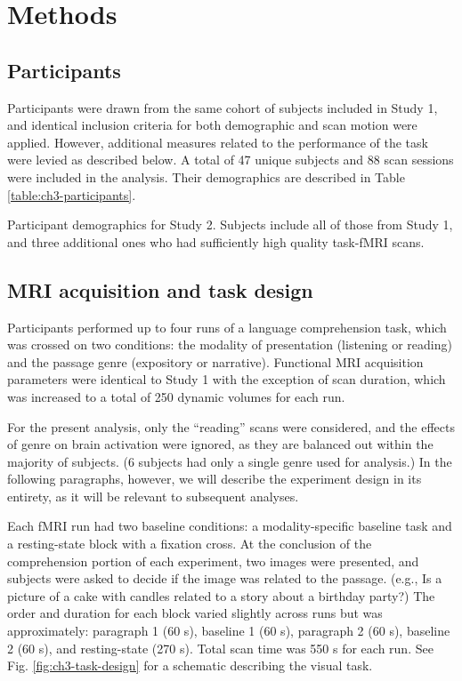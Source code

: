 \section{Methods}

\subsection{Participants}

Participants were drawn from the same cohort of subjects included in Study 1, and identical inclusion criteria for both demographic and scan motion were applied. However, additional measures related to the performance of the task were levied as described below. A total of 47 unique subjects and 88 scan sessions were included in the analysis. Their demographics are described in Table \ref{table:ch3-participants}.

\begin{table}
	\renewcommand{\tabcolsep}{0.09cm}
	\centering
	
	\caption[Participant demographics for Study 2.]{Participant demographics for Study 2. Subjects include all of those from Study 1, and three additional ones who had sufficiently high quality task-fMRI scans.}
	\label{table:ch3-participants}
\end{table}


\subsection{MRI acquisition and task design}

Participants performed up to four runs of a language comprehension task, which was crossed on two conditions: the modality of presentation (listening or reading) and the passage genre (expository or narrative). Functional MRI acquisition parameters were identical to Study 1 with the exception of scan duration, which was increased to a total of 250 dynamic volumes for each run. 

For the present analysis, only the ``reading'' scans were considered, and the effects of genre on brain activation were ignored, as they are balanced out within the majority of subjects. (6 subjects had only a single genre used for analysis.) In the following paragraphs, however, we will describe the experiment design in its entirety, as it will be relevant to subsequent analyses.

Each fMRI run had two baseline conditions: a modality-specific baseline task and a resting-state block with a fixation cross. At the conclusion of the comprehension portion of each experiment, two images were presented, and subjects were asked to decide if the image was related to the passage. (e.g., Is a picture of a cake with candles related to a story about a birthday party?) The order and duration for each block varied slightly across runs but was approximately: paragraph 1 (60 s), baseline 1 (60 s), paragraph 2 (60 s), baseline 2 (60 s), and resting-state (270 s). Total scan time was 550 s for each run. See Fig. \ref{fig:ch3-task-design} for a schematic describing the visual task.


